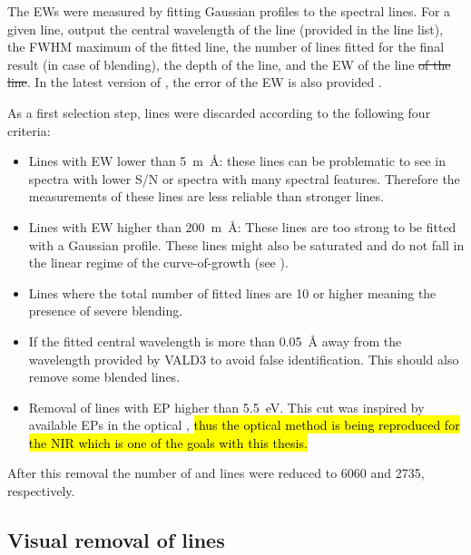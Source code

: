 The EWs were measured by fitting Gaussian profiles to the spectral lines. For a given line,
 output the central wavelength of the line (provided in the line list), the FWHM maximum
of the fitted line, the number of lines fitted for the final result (in case of blending), the depth
of the line, and the EW of the line \st{of the line}. In the latest version of , the
error of the EW is also provided \citep{Sousa2015a}.

As a first selection step, lines were discarded according to the following four criteria:

\begin{itemize}
  \item Lines with EW lower than \SI{5}{m\angstrom}: these lines can be problematic to see in
        spectra with lower S/N or spectra with many spectral features. Therefore the measurements
        of these lines are less reliable than stronger lines.
  \item Lines with EW higher than \SI{200}{m\angstrom}: These lines are too strong to be fitted
        with a Gaussian profile. These lines might also be saturated and do not fall in the linear
        regime of the curve-of-growth (see ).
  \item Lines where the total number of fitted lines are 10 or higher meaning the presence of
        severe blending.
  \item If the fitted central wavelength is more than \SI{0.05}{\angstrom} away from the wavelength
        provided by VALD3 to avoid false identification. This should also remove some blended lines.
  \item Removal of lines with EP higher than \SI{5.5}{eV}. This cut was inspired by available EPs in
        the optical \citep[see e.g.][]{Sousa2008a}, \hl{thus the optical method is being reproduced
        for the NIR which is one of the goals with this thesis.}
\end{itemize}
After this removal the number of  and  lines were reduced to \num{6060} and
\num{2735}, respectively.


\subsection{Visual removal of lines}
\label{sec:visual}

